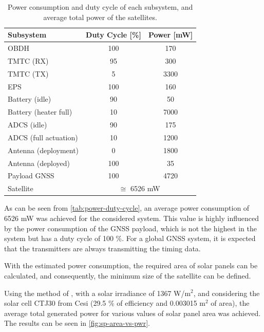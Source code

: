 \begin{table}[!ht]
    \centering
    \begin{tabular}{lcc}
        \toprule[1.5pt]
        \textbf{Subsystem} & \textbf{Duty Cycle [\%]} & \textbf{Power [mW]} \\
        \midrule
        OBDH                  & 100 & 170 \\
        TMTC (RX)             & 95  & 300 \\
        TMTC (TX)             & 5   & 3300 \\
        EPS                   & 100 & 160 \\
        Battery (idle)        & 90  & 50 \\
        Battery (heater full) & 10  & 7000 \\
        ADCS (idle)           & 90  & 175 \\
        ADCS (full actuation) & 10  & 1200 \\
        Antenna (deployment)  & 0   & 1800 \\
        Antenna (deployed)    & 100 & 35 \\
        Payload GNSS          & 100 & 4720 \\
        \cmidrule{2-3}
        Satellite             & \multicolumn{2}{c}{$\cong$ 6526 mW} \\
        \bottomrule[1.5pt]
    \end{tabular}
    \caption{Power consumption and duty cycle of each subsystem, and average total power of the satellites.}
    \label{tab:power-duty-cycle}
\end{table}

As can be seen from \autoref{tab:power-duty-cycle}, an average power consumption of 6526 mW was achieved for the considered system. This value is highly influenced by the power consumption of the GNSS payload, which is not the highest in the system but has a duty cycle of 100 \%. For a global GNSS system, it is expected that the transmitters are always transmitting the timing data.

With the estimated power consumption, the required area of solar panels can be calculated, and consequently, the minimum size of the satellite can be defined.

Using the method of \cite{rigo2023}, with a solar irradiance of 1367 W/m$^{2}$, and considering the solar cell CTJ30 from Cesi \cite{ctj30} (29.5 \% of efficiency and 0.003015 m$^{2}$ of area), the average total generated power for various values of solar panel area was achieved. The results can be seen in \autoref{fig:sp-area-vs-pwr}.

